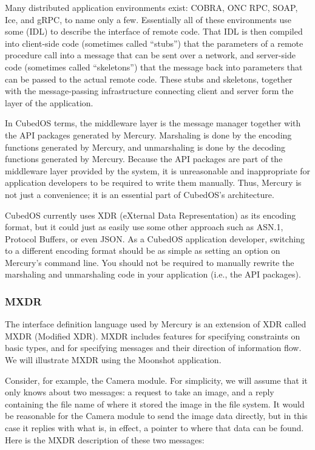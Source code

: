 Many distributed application environments exist: COBRA, ONC RPC, SOAP, Ice, and gRPC, to name
only a few.  Essentially all of these environments use some
 (IDL) to describe the interface of remote code. That IDL
is then compiled into client-side code (sometimes called ``stubs'') that  the
parameters of a remote procedure call into a message that can be sent over a network, and
server-side code (sometimes called ``skeletons'') that  the message back into
parameters that can be passed to the actual remote code. These stubs and skeletons, together
with the message-passing infrastructure connecting client and server form the
 layer of the application.

In CubedOS terms, the middleware layer is the message manager together with the API packages
generated by Mercury. Marshaling is done by the encoding functions generated by Mercury, and
unmarshaling is done by the decoding functions generated by Mercury. Because the API packages
are part of the middleware layer provided by the system, it is unreasonable and inappropriate
for application developers to be required to write them manually. Thus, Mercury is not just a
convenience; it is an essential part of CubedOS's architecture.

CubedOS currently uses XDR (eXternal Data Representation) \cite{rfc-4506} as its encoding
format, but it could just as easily use some other approach such as ASN.1, Protocol Buffers, or
even JSON.  As a CubedOS application developer, switching to a different
encoding format should be as simple as setting an option on Mercury's command line. You should
not be required to manually rewrite the marshaling and unmarshaling code in your application
(i.e., the API packages).

\subsubsection{MXDR}

The interface definition language used by Mercury is an extension of XDR \cite{rfc-4506} called
MXDR (Modified XDR). MXDR includes features for specifying constraints on basic types, and for
specifying messages and their direction of information flow. We will illustrate MXDR using the
Moonshot application.

Consider, for example, the Camera module. For simplicity, we will assume that it only knows
about two messages: a request to take an image, and a reply containing the file name of where
it stored the image in the file system. It would be reasonable for the Camera module to send
the image data directly, but in this case it replies with what is, in effect, a pointer to
where that data can be found. Here is the MXDR description of these two messages:

